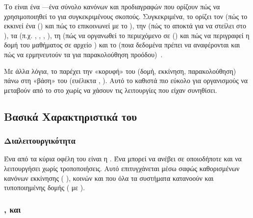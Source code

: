 Το  είναι ένα  —ένα σύνολο κανόνων και προδιαγραφών που ορίζουν πώς να χρησιμοποιηθεί το  για συγκεκριμένους σκοπούς. Συγκεκριμένα, το  ορίζει τον   (πώς το  εκκινεί ένα    () και πώς το  επικοινωνεί με το ), την  (πώς το  αποκτά   για να στείλει  στο ), τα   (π.χ. \texttt{}, \texttt{}, \texttt{}, \texttt{}), τη   (πώς να οργανωθεί το περιεχόμενο σε   () και πώς να περιγραφεί η δομή του μαθήματος σε  αρχείο ) και το     (ποια δεδομένα πρέπει να αναφέρονται και πώς να ερμηνευτούν τα  για παρακολούθηση προόδου)~\cite{nextsoftware2024cmi5,easygenerator2025cmi5}.

Με άλλα λόγια, το  παρέχει την «κορυφή» του  (δομή, εκκίνηση, παρακολούθηση) πάνω στη «βάση» του  (ευέλικτα , ). Αυτό το καθιστά πιο εύκολο για οργανισμούς να μεταβούν από το  στο  χωρίς να χάσουν τις λειτουργίες που είχαν συνηθίσει.

\subsection{Βασικά Χαρακτηριστικά του }
\label{subsec:cmi5_features}

\subsubsection{ Διαλειτουργικότητα}

Ένα από τα κύρια οφέλη του  είναι η  . Ένα    μπορεί να ανέβει σε οποιοδήποτε   και να λειτουργήσει χωρίς τροποποιήσεις. Αυτό επιτυγχάνεται μέσω σαφώς καθορισμένων κανόνων εκκίνησης ( ), κοινών   και  που όλα τα συστήματα κατανοούν και τυποποιημένης δομής   (  με  ).

\subsubsection{,  και }

